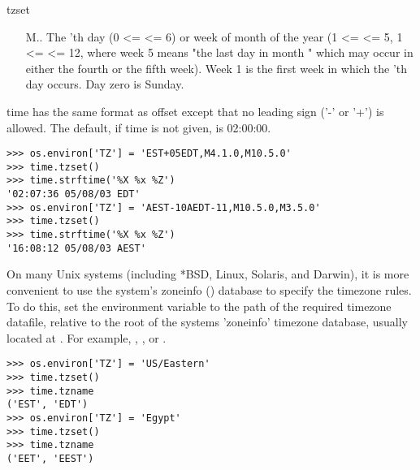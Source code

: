 \begin{funcdesc}{tzset}{}
\begin{itemize}
\begin{itemize}
      \item[M\var{m}.\var{n}.\var{d}]
        The 'th day (0 <=  <= 6) or week  
        of month  of the year (1 <=  <= 5, 
        1 <=  <= 12, where week 5 means "the last  day
        in month " which may occur in either the fourth or 
        the fifth week). Week 1 is the first week in which the 
        'th day occurs. Day zero is Sunday.
    \end{itemize}

    time has the same format as offset except that no leading sign ('-' or
    '+') is allowed. The default, if time is not given, is 02:00:00.
\end{itemize}


\begin{verbatim}
>>> os.environ['TZ'] = 'EST+05EDT,M4.1.0,M10.5.0'
>>> time.tzset()
>>> time.strftime('%X %x %Z')
'02:07:36 05/08/03 EDT'
>>> os.environ['TZ'] = 'AEST-10AEDT-11,M10.5.0,M3.5.0'
>>> time.tzset()
>>> time.strftime('%X %x %Z')
'16:08:12 05/08/03 AEST'
\end{verbatim}

On many Unix systems (including *BSD, Linux, Solaris, and Darwin), it
is more convenient to use the system's zoneinfo () 
database to specify the timezone rules. To do this, set the 
 environment variable to the path of the required timezone 
datafile, relative to the root of the systems 'zoneinfo' timezone database,
usually located at . For example, 
, ,  or 
.

\begin{verbatim}
>>> os.environ['TZ'] = 'US/Eastern'
>>> time.tzset()
>>> time.tzname
('EST', 'EDT')
>>> os.environ['TZ'] = 'Egypt'
>>> time.tzset()
>>> time.tzname
('EET', 'EEST')
\end{verbatim}

\end{funcdesc}


\begin{seealso}
\end{seealso}
